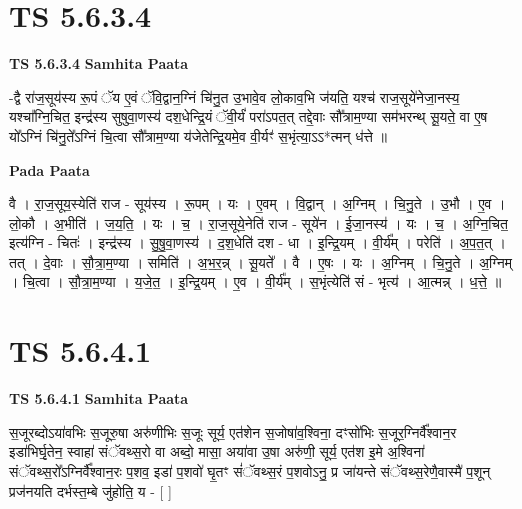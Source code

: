 \documentclass[17pt]{extarticle}
\begin{document}
\section*{ TS 5.6.3.4 }

\textbf{TS 5.6.3.4 } \newline
\textbf{Samhita Paata} \newline

-द्वै रा॑ज॒सूय॑स्य रू॒पं ॅय ए॒वं ॅवि॒द्वान॒ग्निं चि॑नु॒त उ॒भावे॒व लो॒काव॒भि ज॑यति॒ यश्च॑ राज॒सूये॑नेजा॒नस्य॒ यश्चा᳚ग्नि॒चित॒ इन्द्र॑स्य सुषुवा॒णस्य॑ दश॒धेन्द्रि॒यं ॅवी॒र्यं॑ परा॑ऽपत॒त् तद्दे॒वाः सौ᳚त्राम॒ण्या सम॑भरन्थ् सू॒यते॒ वा ए॒ष यो᳚ऽग्निं चि॑नु॒ते᳚ऽग्निं चि॒त्वा सौ᳚त्राम॒ण्या य॑जेतेन्द्रि॒यमे॒व वी॒र्यꣳ॑ स॒भृंत्या॒ऽऽ*त्मन् ध॑त्ते ॥ \newline

\textbf{Pada Paata} \newline

वै । रा॒ज॒सूय॒स्येति॑ राज - सूय॑स्य । रू॒पम् । यः । ए॒वम् । वि॒द्वान् । अ॒ग्निम् । चि॒नु॒ते । उ॒भौ । ए॒व ।   लो॒कौ । अ॒भीति॑ । ज॒य॒ति॒ । यः । च॒ । रा॒ज॒सूये॒नेति॑ राज - सूये॑न । ई॒जा॒नस्य॑ । यः । च॒ । अ॒ग्नि॒चित॒ इत्य॑ग्नि - चितः॑ । इन्द्र॑स्य । सु॒षु॒वा॒णस्य॑ । द॒श॒धेति॑ दश - धा । इ॒न्द्रि॒यम् । वी॒र्य᳚म् । परेति॑ । अ॒प॒त॒त् । तत् । दे॒वाः । सौ॒त्रा॒म॒ण्या । समिति॑ । अ॒भ॒र॒न्न् । सू॒यते᳚ । वै । ए॒षः । यः । अ॒ग्निम् । चि॒नु॒ते । अ॒ग्निम् । चि॒त्वा । सौ॒त्रा॒म॒ण्या । य॒जे॒त॒ । इ॒न्द्रि॒यम् । ए॒व । वी॒र्य᳚म् । स॒भृंत्येति॑ सं - भृत्य॑ । आ॒त्मन्न् । ध॒त्ते॒ ॥  \newline




\section*{ TS 5.6.4.1 }

\textbf{TS 5.6.4.1 } \newline
\textbf{Samhita Paata} \newline

स॒जूरब्दोऽया॑वभिः स॒जूरु॒षा अरु॑णीभिः स॒जूः सूर्य॒ एत॑शेन स॒जोषा॑व॒श्विना॒ दꣳसो॑भिः स॒जूर॒ग्निर्वै᳚श्वान॒र इडा॑भिर्घृ॒तेन॒ स्वाहा॑ संॅवथ्स॒रो वा अब्दो॒ मासा॒ अया॑वा उ॒षा अरु॑णी॒ सूर्य॒ एत॑श इ॒मे अ॒श्विना॑ संॅवथ्स॒रो᳚ऽग्निर्वै᳚श्वान॒रः प॒शव॒ इडा॑ प॒शवो॑ घृ॒तꣳ सं॑ॅवथ्स॒रं प॒शवोऽनु॒ प्र जा॑यन्ते संॅवथ्स॒रेणै॒वास्मै॑ प॒शून् प्रज॑नयति दर्भस्त॒म्बे जु॑होति॒ य - [  ] \newline
\end{document}
